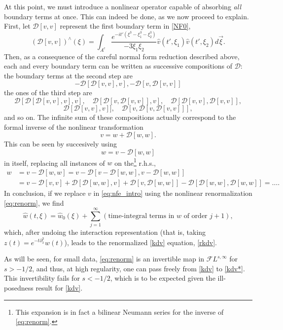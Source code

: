 \documentclass[%
11pt,  reqno]{amsart}
\newcommand{\5}{\textup{V}}
\theoremstyle{remark}
\numberwithin{equation}{section}
\numberwithin{theorem}{section}
\begin{document}
	
	At this point, we must introduce a nonlinear operator capable of absorbing \emph{all} boundary terms at once. This can indeed be done, as we now proceed to explain. First, let $\mathcal{D}[v,v]$ represent the first boundary term  in \eqref{NF0},
	$$
	(\mathcal{D}[v,v])^\wedge(\xi) =  \int_{A^c}\frac{e^{-it' (\xi^3 -
			\xi_1^3 - \xi_2^3) }}{-3\xi_1\xi_2}  \widehat{v}(t', \xi_1) \widehat{v}(t',\xi_2) d\vec{\xi}.
	$$
	Then, as a consequence of the careful normal form reduction described above, each and every boundary term can be written as successive compositions of $\mathcal{D}$: the boundary terms at the second step are
	$$
	-\mathcal{D}[\mathcal{D}[v,v],v], -\mathcal{D}[v,\mathcal{D}[v,v]]
	$$
	the ones of the third step are
	$$
	\mathcal{D}[\mathcal{D}[\mathcal{D}[v,v],v],v],\quad \mathcal{D}[\mathcal{D}[v,\mathcal{D}[v,v]],v],\quad \mathcal{D}[\mathcal{D}[v,v],\mathcal{D}[v,v]],$$
	$$\mathcal{D}[\mathcal{D}[v,v],v]],\quad \mathcal{D}[v,\mathcal{D}[v,\mathcal{D}[v,v]]],
	$$
	and so on. The infinite sum of these compositions actually correspond to the formal inverse of the nonlinear transformation
	\begin{equation}\label{eq:renorm}
		v=w+\mathcal{D}[w,w].
	\end{equation}
	This can be seen by succesively using 
	$$
	w=v-\mathcal{D}[w,w]
	$$
	in itself, replacing all instances of $w$ on the\footnote{This expansion is in fact a bilinear Neumann series for the inverse of \eqref{eq:renorm}.} r.h.s.,
	\begin{align}
		w&=v-\mathcal{D}[w,w]=v-\mathcal{D}[v-\mathcal{D}[w,w],v-\mathcal{D}[w,w]]\\&=v-\mathcal{D}[v,v]+\mathcal{D}[\mathcal{D}[w,w],v]+\mathcal{D}[v,\mathcal{D}[w,w]]-\mathcal{D}[\mathcal{D}[w,w],\mathcal{D}[w,w]]=\dots.
	\end{align}
	In conclusion, if we replace $v$ in \eqref{eq:nfe_intro} using the nonlinear renormalization \eqref{eq:renorm}, we find
	\begin{equation}\label{eq:nfe_intro2}
		\widehat{w}(t,\xi)= \widehat{w}_0(\xi) + \sum_{j=1}^\infty (\mbox{time-integral terms in }w\mbox{ of order }j+1),
	\end{equation}
	which, after undoing the interaction representation (that is, taking $z(t)=e^{-t\partial_x^3}w(t)$), leads to the renormalized \eqref{kdv} equation, \eqref{rkdv}. 
	
	\medskip
	
	
	As will be seen, for small data, \eqref{eq:renorm} is an invertible map in $\mathcal{F}L^{s,\infty}$ for $s>-1/2$, and thus, at high regularity, one can pass freely from \eqref{kdv} to \eqref{kdv*}. This invertibility fails for $s<-1/2$, which is to be expected given the ill-posedness result for \eqref{kdv}.
	
\end{document}

